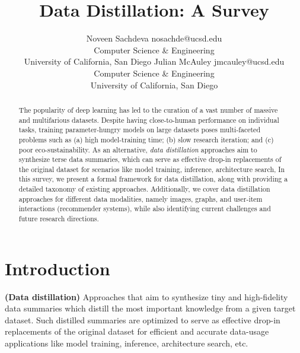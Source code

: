 \documentclass[10pt]{article} %
\title{Data Distillation: A Survey}
\author{\name Noveen Sachdeva \email nosachde@ucsd.edu \\
      \addr Computer Science \& Engineering\\
      University of California, San Diego
      \AND
      \name Julian McAuley \email jmcauley@ucsd.edu \\
      \addr Computer Science \& Engineering\\
      University of California, San Diego%
      }
\begin{document}
\maketitle

\begin{abstract}
    The popularity of deep learning has led to the curation of a vast number of massive and multifarious datasets. Despite having close-to-human performance on individual tasks, training parameter-hungry models on large datasets poses multi-faceted problems such as (a) high model-training time; (b) slow research iteration; and (c) poor eco-sustainability. As an alternative, \emph{data distillation} approaches aim to synthesize terse data summaries, which can serve as effective drop-in replacements of the original dataset for scenarios like model training, inference, architecture search, \etc
    In this survey, we present a formal framework for data distillation, along with providing a detailed taxonomy of existing approaches. Additionally, we cover data distillation approaches for different data modalities, namely images, graphs, and user-item interactions (recommender systems), while also identifying current challenges and future research directions. %
\end{abstract}

\section{Introduction}
\begin{loosedefinition} \label{def:data_distillation}
    {\normalfont \textbf{(Data distillation)}} Approaches that aim to synthesize tiny and high-fidelity data summaries which distill the most important knowledge from a given target dataset. Such distilled summaries are optimized to serve as effective drop-in replacements of the original dataset for efficient and accurate data-usage applications like model training, inference, architecture search, etc.
\end{loosedefinition}
\vspace{0.1cm}
\end{document}
